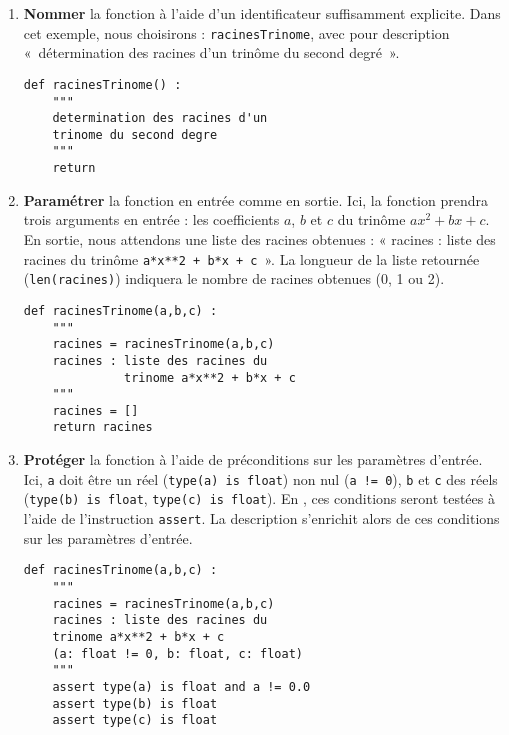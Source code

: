 \begin{enumerate}
\item 
\begin{minipage}[t]{6cm}
\textbf{Nommer} la fonction à l'aide d'un identificateur suffisamment explicite.
Dans cet exemple, nous choisirons : \texttt{racinesTrinome}, avec pour description
«~détermination des racines d'un trinôme du second degré~».
\end{minipage}
\hfill
\begin{minipage}[t]{9cm}\footnotesize
\begin{lstlisting}
def racinesTrinome() :
    """
    determination des racines d'un 
    trinome du second degre
    """
    return
\end{lstlisting}
\end{minipage}
\vspace*{1mm}

\item 
\begin{minipage}[t]{6cm}
\textbf{Paramétrer} la fonction en entrée comme en sortie.
Ici, la fonction prendra trois arguments en entrée : les coefficients $a$, $b$ et $c$
du trinôme $ax^2 + bx + c$. En sortie, nous attendons une liste des racines obtenues : 
« racines : liste des racines du trinôme \texttt{a*x**2 + b*x + c}~».
La longueur de la liste retournée (\texttt{len(racines)}) indiquera le nombre de
racines obtenues (0, 1 ou 2).
\end{minipage}
\hfill
\begin{minipage}[t]{9cm}\footnotesize
\begin{lstlisting}
def racinesTrinome(a,b,c) :
    """
    racines = racinesTrinome(a,b,c)
    racines : liste des racines du 
              trinome a*x**2 + b*x + c
    """
    racines = []
    return racines
\end{lstlisting}
\end{minipage}
\vspace*{2mm}

\item 
\begin{minipage}[t]{6cm}
\textbf{Protéger} la fonction à l'aide de préconditions sur les paramètres d'entrée.
Ici, \texttt{a} doit être un réel (\texttt{type(a) is float}) non nul (\texttt{a != 0}), \texttt{b} et \texttt{c} des réels (\texttt{type(b) is float}, \texttt{type(c) is float}).
En \python, ces conditions seront testées à l'aide de l'instruction \texttt{assert}.
La description s'enrichit alors de ces conditions sur les paramètres d'entrée.
\end{minipage}
\hfill
\begin{minipage}[t]{9cm}\footnotesize
\begin{lstlisting}
def racinesTrinome(a,b,c) :
    """
    racines = racinesTrinome(a,b,c)
    racines : liste des racines du 
    trinome a*x**2 + b*x + c
    (a: float != 0, b: float, c: float)
    """
    assert type(a) is float and a != 0.0
    assert type(b) is float
    assert type(c) is float
    

\end{lstlisting}
\end{minipage}
\end{enumerate}
